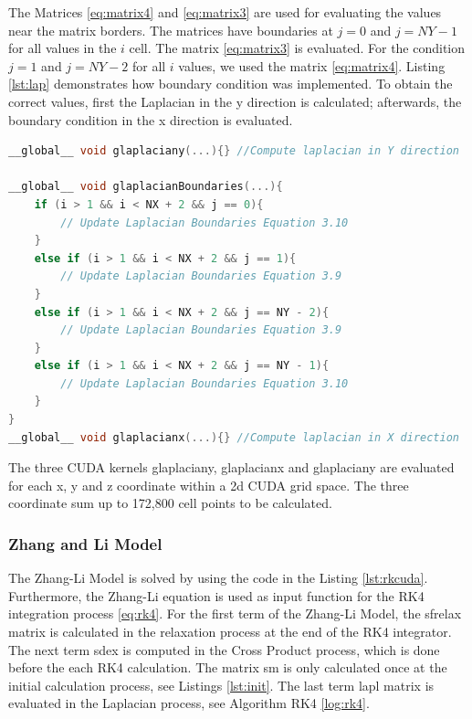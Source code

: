  The Matrices \ref{eq:matrix4} and \ref{eq:matrix3} are used for evaluating the values near the matrix borders. The matrices have boundaries at $j = 0$ and $j = NY - 1$ for all values in the $i$ cell. The matrix \ref{eq:matrix3} is evaluated. For the condition $j = 1$ and $j = NY - 2$ for all $i$ values, we used the matrix \ref{eq:matrix4}. Listing \ref{lst:lap} demonstrates how boundary condition was implemented. To obtain the correct values, first the Laplacian in the y direction is calculated; afterwards, the boundary condition in the x direction is evaluated.

\begin{lstlisting}[language=C++, label={lst:lap}, caption={Evaluation of Laplacian X, Y with boundary condition}]
__global__ void glaplaciany(...){} //Compute laplacian in Y direction

__global__ void glaplacianBoundaries(...){
    if (i > 1 && i < NX + 2 && j == 0){
     	// Update Laplacian Boundaries Equation 3.10
    }
    else if (i > 1 && i < NX + 2 && j == 1){
  		// Update Laplacian Boundaries Equation 3.9
    }
    else if (i > 1 && i < NX + 2 && j == NY - 2){
        // Update Laplacian Boundaries Equation 3.9
    }
    else if (i > 1 && i < NX + 2 && j == NY - 1){
        // Update Laplacian Boundaries Equation 3.10
    }
}
__global__ void glaplacianx(...){} //Compute laplacian in X direction
\end{lstlisting}

The three CUDA kernels {\listf glaplaciany}, {\listf glaplacianx} and {\listf glaplaciany} are evaluated for each x, y and z coordinate within a 2d CUDA grid space. The three coordinate sum up to 172,800 cell points to be calculated.

\subsubsection{Zhang and Li Model}

The Zhang-Li Model is solved by using the code in the Listing \ref{lst:rkcuda}. Furthermore, the Zhang-Li equation is used as input function for the RK4 integration process \ref{eq:rk4}. For the first term of the Zhang-Li Model, the {\listf sfrelax} matrix is calculated in the relaxation process at the end of the RK4 integrator. The next term {\listf sdex} is computed in the Cross Product process, which is done before the each RK4 calculation. The matrix {\listf sm} is only calculated once at the initial calculation process, see Listings \ref{lst:init}. The last term {\listf lapl} matrix is evaluated in the Laplacian process, see Algorithm RK4 \ref{log:rk4}.

